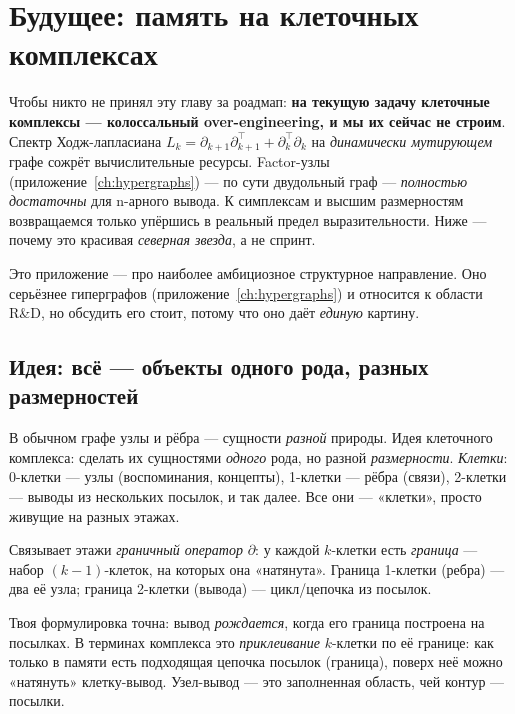 \chapter{Будущее: память на клеточных комплексах}
\label{ch:cellcomplex}

\begin{pitfall}
Чтобы никто не принял эту главу за роадмап: \textbf{на текущую задачу клеточные
комплексы — колоссальный over-engineering, и мы их сейчас не строим}. Спектр
Ходж-лапласиана $L_k=\partial_{k+1}\partial_{k+1}^\top+\partial_k^\top\partial_k$ на
\emph{динамически мутирующем} графе сожрёт вычислительные ресурсы. Factor-узлы
(приложение~\ref{ch:hypergraphs}) — по сути двудольный граф — \emph{полностью
достаточны} для n-арного вывода. К симплексам и высшим размерностям возвращаемся
только упёршись в реальный предел выразительности. Ниже — почему это красивая
\emph{северная звезда}, а не спринт.
\end{pitfall}

Это приложение — про наиболее амбициозное структурное направление. Оно серьёзнее
гиперграфов (приложение~\ref{ch:hypergraphs}) и относится к области R\&D, но обсудить
его стоит, потому что оно даёт \emph{единую} картину.

\section{Идея: всё — объекты одного рода, разных размерностей}

В обычном графе узлы и рёбра — сущности \emph{разной} природы. Идея клеточного
комплекса: сделать их сущностями \emph{одного} рода, но разной \emph{размерности}.
\emph{Клетки}: 0-клетки — узлы (воспоминания, концепты), 1-клетки — рёбра (связи),
2-клетки — выводы из нескольких посылок, и так далее. Все они — «клетки», просто
живущие на разных этажах.

Связывает этажи \emph{граничный оператор} $\partial$: у каждой $k$-клетки есть
\emph{граница} — набор $(k{-}1)$-клеток, на которых она «натянута». Граница 1-клетки
(ребра) — два её узла; граница 2-клетки (вывода) — цикл/цепочка из посылок.

\begin{intuition}
Твоя формулировка точна: вывод \emph{рождается}, когда его граница построена на
посылках. В терминах комплекса это \emph{приклеивание} $k$-клетки по её границе:
как только в памяти есть подходящая цепочка посылок (граница), поверх неё можно
«натянуть» клетку-вывод. Узел-вывод — это заполненная область, чей контур —
посылки.
\end{intuition}

